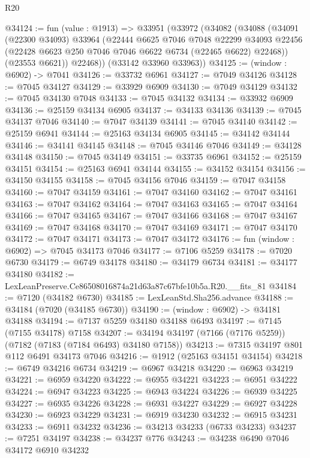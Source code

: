 \begin{lexlean}{R20}
\begin{coremodule}
{@34124 := fun (value : @1913) =>
  @33951
    (@33972
      (@34082
        (@34088
          (@34091
            (@22300 @34093)
            @33964
            (@22444
              @6625
              @7046
              @7048
              @22299
              @34093
              @22456
              (@22428 @6623 @250 @7046 @7046 @6622 @6734 (@22465 @6622) @22468))
            (@23553 @6621))
          @22468))
      (@33142 @33960 @33963))
@34125 := (window : @6902) -> @7041
@34126 := @33732 @6961
@34127 := @7049 @34126
@34128 := @7045 @34127
@34129 := @33929 @6909
@34130 := @7049 @34129
@34132 := @7045 @34130 @7048
@34133 := @7045 @34132
@34134 := @33932 @6909
@34136 := @25159 @34134 @6905
@34137 := @34133 @34136
@34139 := @7045 @34137 @7046
@34140 := @7047 @34139
@34141 := @7045 @34140
@34142 := @25159 @6941
@34144 := @25163 @34134 @6905
@34145 := @34142 @34144
@34146 := @34141 @34145
@34148 := @7045 @34146 @7046
@34149 := @34128 @34148
@34150 := @7045 @34149
@34151 := @33735 @6961
@34152 := @25159 @34151
@34154 := @25163 @6941 @34144
@34155 := @34152 @34154
@34156 := @34150 @34155
@34158 := @7045 @34156 @7046
@34159 := @7047 @34158
@34160 := @7047 @34159
@34161 := @7047 @34160
@34162 := @7047 @34161
@34163 := @7047 @34162
@34164 := @7047 @34163
@34165 := @7047 @34164
@34166 := @7047 @34165
@34167 := @7047 @34166
@34168 := @7047 @34167
@34169 := @7047 @34168
@34170 := @7047 @34169
@34171 := @7047 @34170
@34172 := @7047 @34171
@34173 := @7047 @34172
@34176 := fun (window : @6902) => @7045 @34173 @7046
@34177 := @7106 @5259
@34178 := @7020 @6730
@34179 := @6749 @34178
@34180 := @34179 @6734
@34181 := @34177 @34180
@34182 := LexLeanPreserve.Ce86508016874a21d63a87c67bfe10b5a.R20.__fits_81
@34184 := @7120 (@34182 @6730)
@34185 := LexLeanStd.Sha256.advance
@34188 := @34184 (@7020 (@34185 @6730))
@34190 := (window : @6902) -> @34181 @34188
@34194 := @7137 @5259 @34180 @34188 @6493
@34197 := @7145 (@7155 @34178) @7158
@34207 := @34194 @34197 (@7166 (@7176 @5259)) (@7182 (@7183 (@7184 @6493) @34180 @7158))
@34213 := @7315 @34197 @801 @112 @6491 @34173 @7046
@34216 := @1912 (@25163 @34151 @34154)
@34218 := @6749 @34216 @6734
@34219 := @6967 @34218
@34220 := @6963 @34219
@34221 := @6959 @34220
@34222 := @6955 @34221
@34223 := @6951 @34222
@34224 := @6947 @34223
@34225 := @6943 @34224
@34226 := @6939 @34225
@34227 := @6935 @34226
@34228 := @6931 @34227
@34229 := @6927 @34228
@34230 := @6923 @34229
@34231 := @6919 @34230
@34232 := @6915 @34231
@34233 := @6911 @34232
@34236 := @34213 @34233 (@6733 @34233)
@34237 := @7251 @34197
@34238 := @34237 @776
@34243 := @34238 @6490 @7046 @34172 @6910 @34232
}
\end{coremodule}
\end{lexlean}
